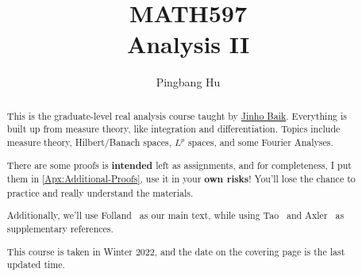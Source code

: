 \documentclass[a4paper]{report}
\author{Pingbang Hu}
\title{MATH597\\Analysis II}
\begin{document}
\maketitle

\begin{abstract}
	This is the graduate-level real analysis course taught by \href{http://www.math.lsa.umich.edu/~baik/Welcome.html}{Jinho Baik}. Everything is built up from measure theory, like integration and differentiation. Topics include measure theory, Hilbert/Banach spaces, $L^p$ spaces, and some Fourier Analyses.

	There are some proofs is \textbf{intended} left as assignments, and for completeness, I put them in \autoref{Apx:Additional-Proofs}, use it in your \textbf{own risks}! You'll lose the chance to practice and really understand the materials.

	Additionally, we'll use Folland~\cite{folland1999real} as our main text, while using Tao~\cite{tao2013introduction} and Axler~\cite{axler2019measure} as supplementary references.

	\vfill
	This course is taken in Winter 2022, and the date on the covering page is the last updated time.
\end{abstract}

\tableofcontents


\newpage
\appendix
\appendixpage



\newpage
\printbibliography
\end{document}
